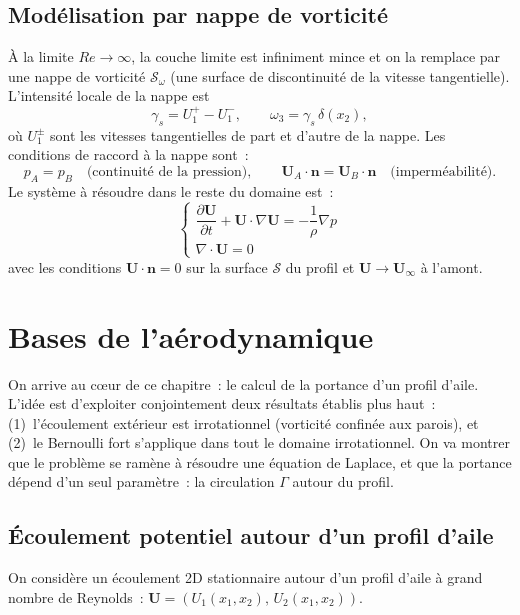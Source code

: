 \documentclass[11pt,a4paper]{report}
\newcommand{\pd}[2]{\dfrac{\partial #1}{\partial #2}}
\begin{document}
\subsection{Mod\'elisation par nappe de vorticit\'e}

\`A la limite $Re \to \infty$, la couche limite est infiniment mince et on la remplace par une
nappe de vorticit\'e $\mathcal{S}_\omega$ (une surface de discontinuit\'e de la vitesse
tangentielle). L'intensit\'e locale de la nappe est
\[
  \gamma_s = U_1^+ - U_1^-, \qquad \omega_3 = \gamma_s\,\delta(x_2),
\]
o\`u $U_1^\pm$ sont les vitesses tangentielles de part et d'autre de la nappe. Les conditions
de raccord \`a la nappe sont~:
\[
  p_A = p_B \quad \text{(continuit\'e de la pression)},
  \qquad \boldsymbol{U}_A\cdot\boldsymbol{n} = \boldsymbol{U}_B\cdot\boldsymbol{n}
  \quad \text{(imperm\'eabilit\'e)}.
\]
Le syst\`eme \`a r\'esoudre dans le reste du domaine est~:
\[
  \begin{cases} \displaystyle\pd{\boldsymbol{U}}{t} + \boldsymbol{U}\cdot\nabla\boldsymbol{U}
  = -\dfrac{1}{\rho}\nabla p \\[6pt] \nabla\cdot\boldsymbol{U} = 0 \end{cases}
\]
avec les conditions $\boldsymbol{U}\cdot\boldsymbol{n}=0$ sur la surface $\mathcal{S}$ du
profil et $\boldsymbol{U}\to\boldsymbol{U}_\infty$ \`a l'amont.

\section{Bases de l'a\'erodynamique}

On arrive au c\oe ur de ce chapitre~: le calcul de la portance d'un profil d'aile.
L'id\'ee est d'exploiter conjointement deux r\'esultats \'etablis plus haut~:
(1)~l'\'ecoulement ext\'erieur est irrotationnel (vorticit\'e confin\'ee aux parois),
et (2)~le Bernoulli fort s'applique dans tout le domaine irrotationnel. On va montrer
que le probl\`eme se ram\`ene \`a r\'esoudre une \'equation de Laplace, et que la
portance d\'epend d'un seul param\`etre~: la circulation $\Gamma$ autour du profil.

\subsection{\'Ecoulement potentiel autour d'un profil d'aile}

On consid\`ere un \'ecoulement 2D stationnaire autour d'un profil d'aile \`a grand nombre de
Reynolds~: $\boldsymbol{U} = (U_1(x_1,x_2),\, U_2(x_1,x_2))$.
\end{document}
